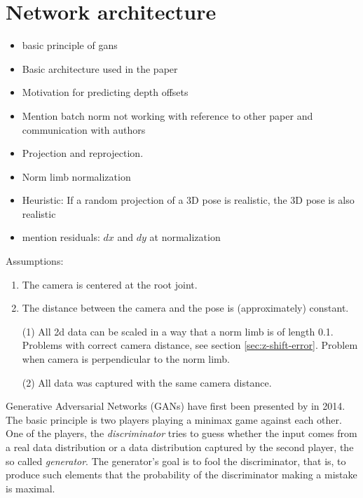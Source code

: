 \section{Network architecture}\label{sec:network}
\begin{itemize}
	\item basic principle of gans
	\item Basic architecture used in the paper
	\item Motivation for predicting depth offsets
	\item Mention batch norm not working with reference to other paper and communication with authors
	\item Projection and reprojection.
	\item Norm limb normalization
	\item Heuristic: If a random projection of a 3D pose is realistic, the 3D pose is also realistic
	\item mention residuals: $dx$ and $dy$ at normalization
\end{itemize}

Assumptions:
\begin{enumerate}[label=(\Alph*)]
	\item The camera is centered at the root joint.
	\item The distance between the camera and the pose is (approximately) constant. 
\end{enumerate}
\begin{itemize}
	\item[(1)] All 2d data can be scaled in a way that a norm limb is of length 0.1. 
	Problems with correct camera distance, see section \ref{sec:z-shift-error}. 
	Problem when camera is perpendicular to the norm limb.
	\item[(2)] All data was captured with the same camera distance.
\end{itemize}

Generative Adversarial Networks (GANs) have first been presented by \citet{goodfellow14} in 2014.
The basic principle is two players playing a minimax game against each other.
One of the players, the \textit{discriminator} tries to guess whether the input comes from a real data distribution or a data distribution captured by the second player, the so called \textit{generator}. 
The generator's goal is to fool the discriminator, that is, to produce such elements that the probability of the discriminator making a mistake is maximal.



